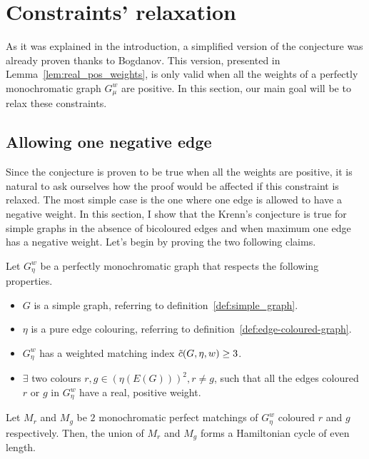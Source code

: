 \section{Constraints' relaxation}
\label{sec:constraints-relaxation}

As it was explained in the introduction, a simplified version of the conjecture was already proven thanks to Bogdanov.\cite{bogdanov}
This version, presented in Lemma~\ref{lem:real_pos_weights}, is only valid when all the weights of a perfectly monochromatic graph $G_\mu^w$ are positive.  %
In this section, our main goal will be to relax these constraints.

\subsection{Allowing one negative edge}
\label{subsec:one_negative_edge}

Since the conjecture is proven to be true when all the weights are positive, it is natural to ask ourselves how the proof would be affected if this constraint is relaxed.
The most simple case is the one where one edge is allowed to have a negative weight.
In this section, I show that the Krenn's conjecture is true for simple graphs in the absence of bicoloured edges and when maximum one edge has a negative weight.
Let's begin by proving the two following claims.

\begin{claim}
    \label{clm:2_positive_classes_ham_cycle}
    Let $G_\eta^w$ be a perfectly monochromatic graph that respects the following properties.
    \begin{itemize}
        \item $G$ is a simple graph, referring to definition~\ref{def:simple_graph}.
        \item $\eta$ is a pure edge colouring, referring to definition~\ref{def:edge-coloured-graph}.
        \item $G_\eta^w$ has a weighted matching index $\Tilde{c}(G, \eta, w) \geq 3$.
        \item $\exists$ two colours $r, g \in \left(\eta(E(G))\right)^2, r \neq g$, such that all the edges coloured $r$ or $g$ in $G_\eta^w$ have a real, positive weight.
    \end{itemize}

    Let $M_r$ and $M_g$ be $2$ monochromatic perfect matchings of $G_\eta^w$ coloured $r$ and $g$ respectively.
    Then, the union of $M_r$ and $M_g$ forms a Hamiltonian cycle of even length.
\end{claim}

